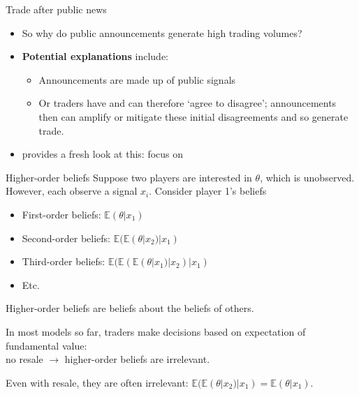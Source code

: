 \documentclass[english,10pt
,aspectratio=169
]{beamer}
\begin{document}
\begin{frame}{Trade after public news}
	\begin{itemize}
		\item So why do public announcements generate high trading volumes?
		\item \textbf{Potential explanations} include:
		\begin{itemize}
			\item Announcements are made up of public  signals
			\item Or traders have  and can therefore `agree to disagree'; announcements then can amplify or mitigate these initial disagreements and so generate trade.
		\end{itemize}
		\item \textbf{\cite{kondor_more_2012}} provides a fresh look at this: focus on  
	\end{itemize}
\end{frame}


\begin{frame}{Higher-order beliefs}
	Suppose two players are interested in $\theta$, which is unobserved. However, each observe a signal $x_{i}$. Consider player 1's beliefs
	\begin{itemize}
		\item First-order beliefs: $\mathbb{E}(\theta|x_{1})$
		\item Second-order beliefs: $\mathbb{E}(\mathbb{E}(\theta|x_{2})|x_{1})$
		\item Third-order beliefs: $\mathbb{E}(\mathbb{E}(\mathbb{E}(\theta|x_{1})|x_{2})|x_{1})$
		\item Etc.
	\end{itemize}
	Higher-order beliefs are beliefs about the beliefs of others.
	
	\pause\bigskip
	In most models so far, traders make decisions based on expectation of fundamental value: \\ no resale $\rightarrow$ higher-order beliefs are irrelevant.
	
	Even with resale, they are often irrelevant: $\mathbb{E}(\mathbb{E}(\theta|x_{2})|x_{1}) = \mathbb{E}(\theta|x_{1})$.
\end{frame}
\end{document}

